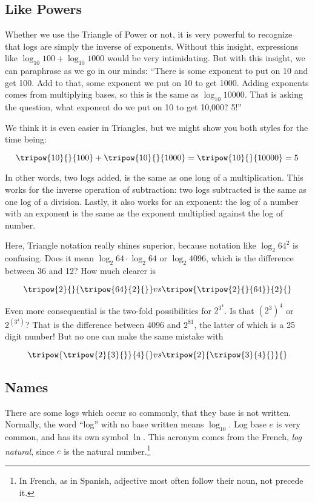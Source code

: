 
\subsection{Like Powers}



Whether we use the Triangle of Power or not, it is very powerful to recognize
that logs are simply the inverse of exponents.  Without this insight, expressions
like $\log_{10}{100} + \log_{10}{1000}$ would be very intimidating.  But with this
insight, we can paraphrase as we go in our minds: ``There is some exponent
to put on 10 and get 100.  Add to that, some exponent we put on 10 to get 
1000.  Adding exponents comes from multiplying bases, so this is the same as
$\log_{10}10000$.  That is asking the question, what exponent do we put on 10
to get 10,000?  5!''

We think it is even easier in Triangles, but we might show you both styles for
the time being:

$$
\tripow{10}{}{100} + \tripow{10}{}{1000} = \tripow{10}{}{10000} = 5
$$

In other words, two logs added, is the same as one long of a multiplication.  This
works for the inverse operation of subtraction: two logs subtracted is the same
as one log of a division.  Lastly, it also works for an exponent: the log of a number
with an exponent is the same as the exponent multiplied against the log of number.

Here, Triangle notation really shines superior, because notation like $\log_2{64^2}$
is confusing.  Does it mean $\log_2{64} \cdot \log_2{64}$ or $\log_2{4096}$, which
is the difference between 36 and 12?  How much clearer is

$$
\tripow{2}{}{\tripow{64}{2}{}} vs \tripow{\tripow{2}{}{64}}{2}{}
$$

Even more consequential is the two-fold possibilities for $2^{3^4}$.  Is that $(2^3)^4$
or $2^{(3^4)}$?  That is the difference between 4096 and $2^81$, the latter of which
is a 25 digit number!  But no one can make the same mistake with

$$
\tripow{\tripow{2}{3}{}}{4}{} vs \tripow{2}{\tripow{3}{4}{}}{}
$$


\subsection{Names}
There are some logs which occur so commonly, that they base is not written.  Normally,
the word ``log'' with no base written means $\log_{10}$.  Log base $e$ is very common,
and has its own symbol $\ln$.  This acronym comes from the French, \textit{log
natural}, since $e$ is the natural number.\footnote{In French, as in Spanish, adjective
most often follow their noun, not precede it.}  

